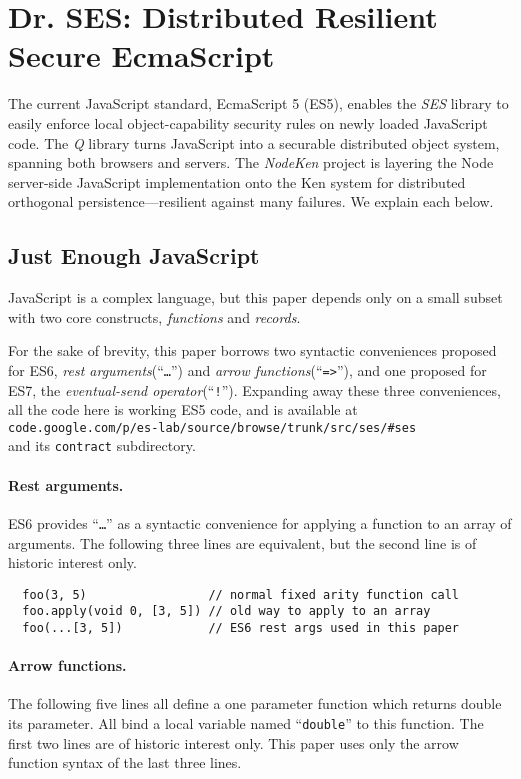 \documentclass{llncs}
\begin{document}
\section{Dr. SES: Distributed Resilient Secure EcmaScript}

The current JavaScript standard, EcmaScript 5 (ES5), enables the \emph{SES} library to easily enforce local object-capability security rules on newly loaded JavaScript code. The \emph{Q} library turns JavaScript into a securable distributed object system, spanning both browsers and servers. The \emph{NodeKen} project is layering the Node server-side JavaScript implementation onto the Ken system for distributed orthogonal persistence---resilient against many failures. We explain each below.

\subsection{Just Enough JavaScript}

JavaScript is a complex language, but this paper depends only on a small subset with two core constructs, \emph{functions} and \emph{records}. 

For the sake of brevity, this paper borrows two syntactic conveniences proposed for ES6, \emph{rest arguments}(``{\tt \ldots}'') and \emph{arrow functions}(``{\tt =>}''), and one proposed for ES7, the \emph{eventual-send operator}(``{\tt !}''). Expanding away these three conveniences, all the code here is working ES5 code, and is available at \\
{\tt code.google.com/p/es-lab/source/browse/trunk/src/ses/\#ses} \\
and its {\tt contract} subdirectory.

\paragraph{Rest arguments.} ES6 provides ``{\tt \ldots}'' as a syntactic convenience for applying a function to an array of arguments. The following three lines are equivalent, but the second line is of historic interest only.

\begin{verbatim}
  foo(3, 5)                 // normal fixed arity function call
  foo.apply(void 0, [3, 5]) // old way to apply to an array
  foo(...[3, 5])            // ES6 rest args used in this paper
\end{verbatim}

\paragraph{Arrow functions.} The following five lines all define a one parameter function which returns double its parameter. All bind a local variable named ``{\tt double}'' to this function. The first two lines are of historic interest only. This paper uses only the arrow function syntax of the last three lines.
\end{document}
